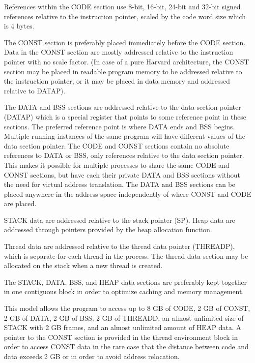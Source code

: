 \documentclass[forwardcom.tex]{subfiles}
\begin{document}
References within the CODE section use 8-bit, 16-bit, 24-bit and 32-bit signed references relative to the instruction pointer, scaled by the code word size which is 4 bytes. 
\vspace{2mm}

The CONST section is preferably placed immediately before the CODE section. Data in the CONST section are mostly addressed relative to the instruction pointer with no scale factor. (In case of a pure Harvard architecture, the CONST section may be placed in readable program 
memory to be addressed relative to the instruction pointer, or it may be placed in data memory and addressed relative to DATAP). 
\vspace{2mm}

The DATA and BSS sections are addressed relative to the data section pointer (DATAP) which is a special register that points to some reference point in these sections. The preferred reference point is where DATA ends and BSS begins. Multiple running instances of the same program will have different values of the data section pointer. The CODE and CONST sections contain no absolute references to DATA or BSS, only references relative to the data section pointer. This makes it possible for multiple processes to share the same CODE and CONST sections, but have each their private DATA and BSS sections without the need for virtual address translation. The DATA and BSS sections can be placed anywhere in the address space independently of where CONST and CODE are placed.
\vspace{2mm}

STACK data are addressed relative to the stack pointer (SP). Heap data are addressed through pointers provided by the heap allocation function. 
\vspace{2mm}

Thread data are addressed relative to the thread data pointer (THREADP), which is separate for each thread in the process. The thread data section may be allocated on the stack when a new thread is created.
\vspace{2mm}

The STACK, DATA, BSS, and HEAP data sections are preferably kept together in one contiguous block in order to optimize caching and memory management. 
\vspace{2mm}

This model allows the program to access up to 8 GB of CODE, 2 GB of CONST, 2 GB of DATA, 2 GB of BSS, 2 GB of THREADD, an almost unlimited size of STACK with 2 GB frames, and an almost unlimited amount of HEAP data. A pointer to the CONST section is provided in the thread environment block in order to access CONST data in the rare case that the distance between code and data exceeds 2 GB or in order to avoid address relocation. 
\vspace{2mm}
\end{document}

